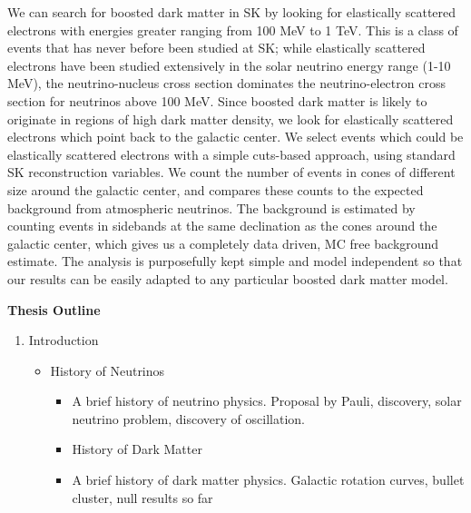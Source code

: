 \documentclass[12pt,oneside,openright]{article}
\begin{document}
We can search for boosted dark matter in SK by looking for elastically scattered electrons with energies greater ranging from 100 MeV to 1 TeV.  This is a class of events that has never before been studied at SK; while elastically scattered electrons have been studied extensively in the solar neutrino energy range (1-10 MeV), the neutrino-nucleus cross section dominates the neutrino-electron cross section for neutrinos above 100 MeV.  Since boosted dark matter is likely to originate in regions of high dark matter density, we look for elastically scattered electrons which point back to the galactic center.  We select events which could be elastically scattered electrons with a simple cuts-based approach, using standard SK reconstruction variables.  We count the number of events in cones of different size around the galactic center, and compares these counts to the expected background from atmospheric neutrinos.  The background is estimated by counting events in sidebands at the same declination as the cones around the galactic center, which gives us a completely data driven, MC free background estimate.  The analysis is purposefully kept simple and model independent so that our results can be easily adapted to any particular boosted dark matter model.\par
\newpage
\bf{Thesis Outline}
\begin{enumerate}
\item Introduction
	\begin{itemize} 
	\item History of Neutrinos 
		\begin{itemize}
		\item A brief history of neutrino physics.  Proposal by Pauli, discovery, solar neutrino problem, discovery of oscillation. 
		\end{itemize}
		\begin{itemize}
	\item History of Dark Matter
		\end{itemize}
		\begin{itemize}
		\item A brief history of dark matter physics.  Galactic rotation curves, bullet cluster, null results so far
		\end{itemize}
	\end{itemize}   
\end{enumerate}
\end{document}
